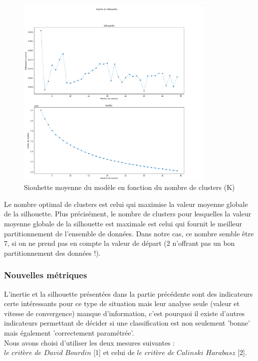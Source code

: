 \documentclass{article}
\begin{document}
\begin{figure}[H]
	\centering
	\includegraphics[width=0.85\textwidth]{"./Images/silouhette.png"}
	\caption{Siouhette moyenne du modèle en fonction du nombre de clusters (K)}
	\label{fig:sil}
\end{figure}

Le nombre optimal de clusters est celui qui maximise la valeur moyenne globale de la silhouette. Plus précisément, le nombre de clusters pour lesquelles la valeur moyenne globale de la silhouette est maximale est celui qui fournit le meilleur partitionnement de l’ensemble de données. Dans notre cas, ce nombre semble être 7, si on ne prend pas en compte la valeur de départ (2 n'offrant pas un bon partitionnement des données !).

\newpage

\subsubsection{Nouvelles métriques}

L'inertie et la silhouette présentées dans la partie précédente sont des indicateurs certe intéressants pour ce type de situation mais leur analyse seule (valeur et vitesse de convergence) manque d'information, c'est pourquoi il existe d'autres indicateurs permettant de décider si une classification est non seulement 'bonne' mais également 'correctement paramétrée'.  \\

Nous avons choisi d'utiliser les deux mesures suivantes : $\textit{le critère de David Bourdin}$ [1] et celui de $\textit{le critère de Calinski Harabasz}$ [2].
\end{document}
